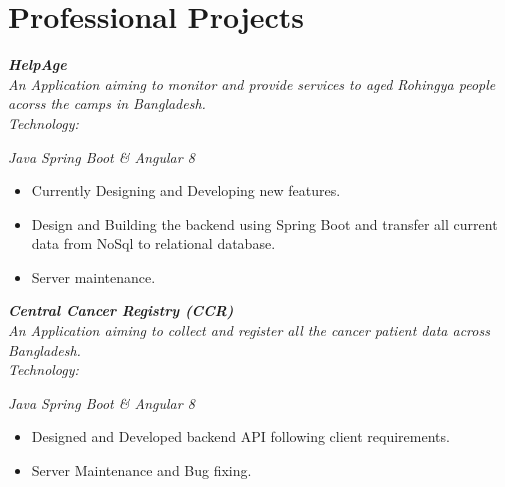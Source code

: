 \documentclass[11pt, a4paper]{awesome-cv}
\begin{document}
{{{{\section*{Professional Projects}
\vspace{-20pt}
\noindent\makebox[\linewidth]{\rule{500pt}{1.8pt}}

{\sl \textbf{HelpAge}   \\
	An Application aiming to monitor and provide services to aged Rohingya people acorss the camps in Bangladesh. \\
	{\sl Technology:} {\sl Java Spring Boot \& Angular 8
			\vspace*{-.6em}	
		\begin{itemize}
			\item Currently Designing and Developing new features. 
			\vspace*{-.5em}
			\item Design and Building the backend using Spring Boot and transfer all current data from NoSql to relational database. 
			\vspace*{-.5em}
			\item Server maintenance.
		\end{itemize}
	\vspace*{-.5em}

{\sl \textbf{Central Cancer Registry (CCR)}   \\
An Application aiming to collect and register all the cancer patient data across Bangladesh. \\
{\sl Technology:} {\sl Java Spring Boot \& Angular 8
		\vspace*{-.6em}	
\begin{itemize}
	\item  Designed and Developed backend API following client requirements.
	\vspace*{-.5em}
	\item  Server Maintenance  and Bug fixing.
	\vspace*{-.5em}
\end{itemize}

}}}}}}}}
\end{document}
